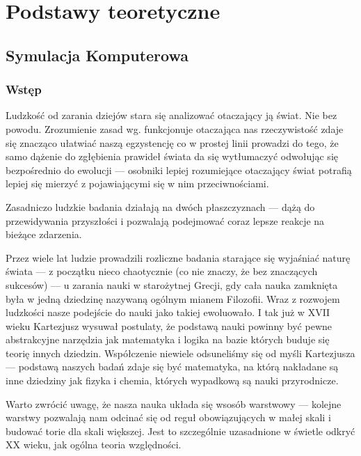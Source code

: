 \chapter{Podstawy teoretyczne}
\section[Symulacja komputerowa][Symulacja komputerowa]{Symulacja Komputerowa}

\subsection{Wstęp}
\par{
Ludzkość od zarania dziejów stara się analizować otaczający ją świat. Nie bez powodu. Zrozumienie zasad wg. funkcjonuje otaczająca nas rzeczywistość zdaje się znacząco ułatwiać naszą egzystencję co w prostej linii prowadzi do tego, że samo dążenie do zgłębienia prawideł świata da się wytłumaczyć odwołując się bezpośrednio do ewolucji --- osobniki lepiej rozumiejące otaczający świat potrafią lepiej się mierzyć z pojawiającymi się w nim przeciwnościami.
}

\par{
Zasadniczo ludzkie badania działają na dwóch płaszczyznach --- dążą do przewidywania przyszłości i pozwalają podejmować coraz lepsze reakcje na bieżące zdarzenia.
}

\par{
Przez wiele lat ludzie prowadzili rozliczne badania starające się wyjaśniać naturę świata --- z początku nieco chaotycznie (co nie znaczy, że bez znaczących sukcesów) --- u zarania nauki w starożytnej Grecji, gdy cała nauka zamknięta była w jedną dziedzinę nazywaną ogólnym mianem Filozofii.
Wraz z rozwojem ludzkości nasze podejście do nauki jako takiej ewoluowało. I tak już w XVII wieku Kartezjusz wysuwał postulaty, że podstawą nauki powinny być pewne abstrakcyjne narzędzia jak matematyka i logika na bazie których buduje się teorię innych dziedzin. Współczenie niewiele odsuneliśmy się od myśli Kartezjusza --- podstawą naszych badań zdaje się być matematyka, na którą nakładane są inne dziedziny jak fizyka i chemia, których wypadkową są nauki przyrodnicze.
}

\par{
Warto zwrócić uwagę, że nasza nauka układa się wsosób warstwowy --- kolejne warstwy pozwalają nam odcinać się od reguł obowiązujących w małej skali i budować torie dla skali większej. Jest to szczególnie uzasadnione w świetle odkryć XX wieku, jak ogólna teoria względności.
}

